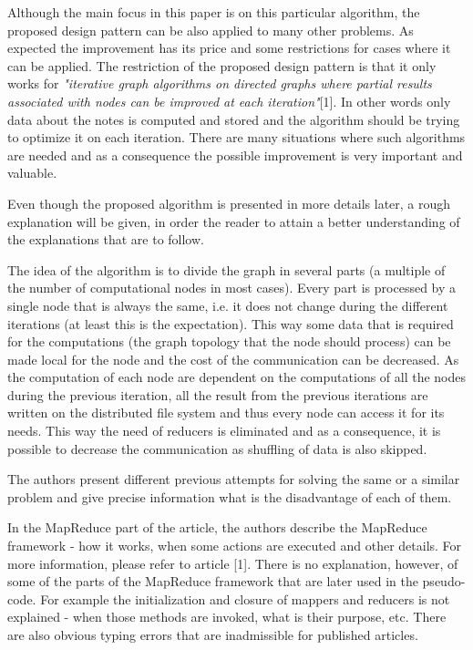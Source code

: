 \documentclass[12pt]{article}
\theoremstyle{plain}
\begin{document}
  Although the main focus in this paper is on this particular algorithm, the
  proposed design pattern can be also applied to many other problems. As
  expected the improvement has its price and some restrictions for cases where
  it can be applied. The restriction of the proposed design pattern is that it
  only works for \emph{"iterative graph algorithms on directed graphs where
    partial results associated with nodes can be improved at each
  iteration"}[1]. In other words only data about the notes is computed and
  stored and the algorithm should be trying to optimize it on each iteration. 
  There are many situations where such algorithms are needed and as a
  consequence the possible improvement is very important and valuable.  

  Even though the proposed algorithm is presented in more details later, a rough
  explanation will be given, in order the reader to attain a better
  understanding of the explanations that are to follow.

  The idea of the algorithm is to divide the graph in several parts (a multiple
  of the number of computational nodes in most cases). Every part is processed
  by a single node that is always the same, i.e. it does not change during the
  different iterations (at least this is the expectation). This way some data
  that is required for the computations (the graph topology that the node should
  process) can be made local for the node and the cost of the communication can
  be decreased. As the computation of each node are dependent on the
  computations of all the nodes during the previous iteration, all the result
  from the previous iterations are written on the distributed file system and
  thus every node can access it for its needs. This way the need of reducers is
  eliminated and as a consequence, it is possible to decrease the communication
  as shuffling of data is also skipped.  

  The authors present different previous attempts for solving the same or a 
  similar problem and give precise information what is the disadvantage of each
  of them.

  In the MapReduce part of the article, the authors describe the MapReduce
  framework - how it works, when some actions are executed and other details.
  For more information, please refer to article [1]. There is no explanation,
  however, of some of the parts of the MapReduce framework that are later used
  in the pseudo-code. For example the initialization and closure of mappers and
  reducers is not explained - when those methods are invoked, what is their
  purpose, etc. There are also obvious typing errors that are inadmissible for
  published articles.  
\end{document}
